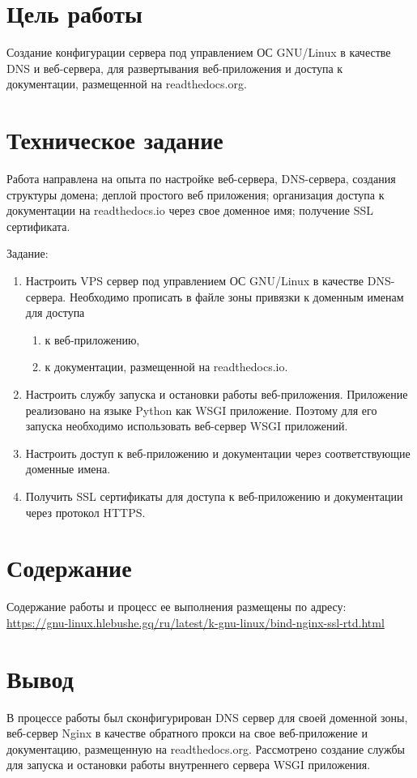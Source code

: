 \documentclass[12pt,a4paper]{article}
\begin{document}
\makeqtitle
\setcounter{page}{2}

\section{Цель работы}

Создание конфигурации сервера под управлением ОС GNU/Linux в качестве
DNS и веб-сервера, для развертывания веб-приложения и доступа к документации,
размещенной на readthedocs.org.

\section{Техническое задание}

Работа направлена на опыта по настройке веб-сервера, DNS-сервера, создания структуры домена;
деплой простого веб приложения; организация доступа к документации на readthedocs.io через
свое доменное имя; получение SSL сертификата.

Задание:

\begin{enumerate}
    \item Настроить VPS сервер под управлением ОС GNU/Linux в качестве DNS-сервера.
          Необходимо прописать в файле зоны привязки к доменным именам для доступа
        \begin{enumerate}
            \item к веб-приложению,
            \item к документации, размещенной на readthedocs.io.
        \end{enumerate}
    \item Настроить службу запуска и остановки работы веб-приложения.
          Приложение реализовано на языке Python как WSGI приложение. Поэтому для его запуска
          необходимо использовать веб-сервер WSGI приложений.
    \item Настроить доступ к веб-приложению и документации через соответствующие доменные имена.
    \item Получить SSL сертификаты для доступа к веб-приложению и документации через протокол HTTPS.
\end{enumerate}

\section{Содержание}

Содержание работы и процесс ее выполнения размещены по адресу: \\
\url{https://gnu-linux.hlebushe.gq/ru/latest/k-gnu-linux/bind-nginx-ssl-rtd.html}

\section{Вывод}

В процессе работы был сконфигурирован DNS сервер для своей доменной зоны,
веб-сервер Nginx в качестве обратного прокси на свое веб-приложение и документацию,
размещенную на readthedocs.org. Рассмотрено создание службы для запуска и остановки работы
внутреннего сервера WSGI приложения.
\end{document}
